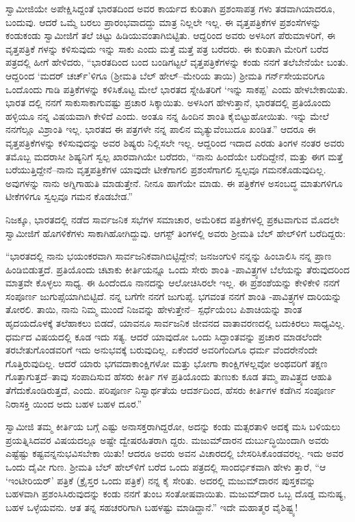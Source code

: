 ಸ್ವಾಮೀಜಿಯೇ ಅಪೇಕ್ಷಿಸಿದ್ದಂತೆ ಭಾರತದಿಂದ ಅವರ ಕಾರ್ಯದ ಕುರಿತಾಗಿ ಪ್ರಶಂಸಾಪತ್ರ ಗಳು ತಡವಾಗಿಯಾದರೂ, ಬಂದುವು. ಆದರೆ ಒಮ್ಮೆ ಬರಲು ಪ್ರಾರಂಭವಾದದ್ದು ಮಾತ್ರ ನಿಲ್ಲಲೇ ಇಲ್ಲ. ಈ ವೃತ್ತಪತ್ರಿಕೆಗಳ ಪ್ರಶಂಸೆಗಳನ್ನು ಕಂಡುಕಂಡು ಸ್ವಾಮೀಜಿಗೆ ತಲೆ ಚಿಟ್ಟು ಹಿಡಿಯುವಂತಾಗಿಬಿಟ್ಟಿತು. ಆದ್ದರಿಂದ ಅವರು ಅಳಸಿಂಗ ಪೆರುಮಾಳರಿಗೆ, ಈ ವೃತ್ತಪತ್ರಿಕೆ ಗಳನ್ನು ಕಳಿಸುವುದು ಇನ್ನು ಸಾಕು ಎಂದು ಮತ್ತೆ ಮತ್ತೆ ಪತ್ರ ಬರೆದರು. ಈ ಕುರಿತಾಗಿ ಮೇರಿಗೆ ಬರೆದ ಪತ್ರದಲ್ಲಿ ಹೀಗೆ ಹೇಳಿದರು, “ಭಾರತದಿಂದ ಬಂದ ಬಂಡಿಗಟ್ಟಲೆ ವೃತ್ತಪತ್ರಿಕೆಗಳನ್ನು ಕಂಡು ನನಗೆ ತಲೆಬೇನೆಯೇ ಬಂತು. ಆದ್ದರಿಂದ ‘ಮದರ್ ಚರ್ಚ್​’ಳಿಗೂ (ಶ್ರೀಮತಿ ಬೆಲ್ ಹೇಲ್​–ಮೇರಿಯ ತಾಯಿ) ಶ್ರೀಮತಿ ಗರ್ನ್​ಸೇಯವರಿಗೂ ಒಂದೊಂದು ಗಾಡಿ ಪತ್ರಿಕೆಗಳನ್ನು ಕಳಿಸಿಕೊಟ್ಟ ಮೇಲೆ ಭಾರತದ ಸ್ನೇಹಿತರಿಗೆ ‘ಇನ್ನು ಸಾಕಪ್ಪ’ ಎಂದು ಹೇಳಬೇಕಾಯಿತು. ಭಾರತ ದಲ್ಲಿ ನನಗೆ ಸಾಕುಸಾಕಾಗುವಷ್ಟು ಪ್ರಚಾರ ಸಿಕ್ಕಾಯಿತು. ಅಳಸಿಂಗ ಹೇಳುತ್ತಾನೆ, ಭಾರತದಲ್ಲಿ ಪ್ರತಿಯೊಂದು ಹಳ್ಳಿಯೂ ನನ್ನ ವಿಷಯವಾಗಿ ಕೇಳಿದೆ ಎಂದು. ಅಂತೂ ನನ್ನ ಹಿಂದಿನ ಶಾಂತಿ ಕೈಬಿಟ್ಟುಹೋಯಿತು. ಇನ್ನು ಮೇಲೆ ನನಗೆಲ್ಲೂ ವಿಶ್ರಾಂತಿ ಇಲ್ಲ. ಭಾರತದ ಈ ಪತ್ರಗಳೇ ನನ್ನ ಪಾಲಿನ ಮೃತ್ಯುವೆಂಬುದೂ ಖಂಡಿತ.” ಆದರೂ ಈ ವೃತ್ತಪತ್ರಿಕೆಗಳನ್ನು ಕಳಿಸುವುದನ್ನು ಅವರ ಶಿಷ್ಯರು ನಿಲ್ಲಿಸಲೇ ಇಲ್ಲ. ಆದ್ದರಿಂದ ಇದಾದ ಎರಡು ತಿಂಗಳ ನಂತರ ಅವರು ತಮೊಬ್ಬ ಮದರಾಸೀ ಶಿಷ್ಯನಿಗೆ ಸ್ವಲ್ಪ ಖಾರವಾಗಿಯೇ ಬರೆದರು, “ನಾನು ಹಿಂದೆಯೇ ಬರೆದಿದ್ದೇನೆ, ಮತ್ತು ಈಗ ಮತ್ತೆ ಬರೆಯುತ್ತಿದ್ದೇನೆ–ನಾನು ವೃತ್ತಪತ್ರಿಕೆಗಳ ಯಾವುದೇ ಟೀಕೆಗಾಗಲಿ ಪ್ರಶಂಸೆಗಾಗಲಿ ಸ್ವಲ್ಪವೂ ಗಮನಕೊಡುವುದಿಲ್ಲ. ಅವುಗಳನ್ನು ನಾನು ಅಗ್ನಿಗಾಹುತಿ ಮಾಡುತ್ತೇನೆ. ನೀನೂ ಹಾಗೆಯೇ ಮಾಡು. ಈ ಪತ್ರಿಕೆಗಳ ಅಸಂಬದ್ಧ ಮಾತುಗಳಿಗೂ ಟೀಕೆಗಳಿಗೂ ಸ್ವಲ್ಪವೂ ಗಮನ ಕೊಡಬೇಡ.”

ನಿಜಕ್ಕೂ, ಭಾರತದಲ್ಲಿ ನಡೆದ ಸಾರ್ವಜನಿಕ ಸಭೆಗಳ ಸಮಾಚಾರ, ಅಮೆರಿಕದ ಪತ್ರಿಕೆಗಳಲ್ಲಿ ಪ್ರಕಟವಾಗುವ ಮೊದಲೇ ಸ್ವಾಮೀಜಿಗೆ ಹೊಗಳಿಕೆಗಳು ಸಾಕಾಗಿಹೋಗಿದ್ದುವು. ಆಗಸ್ಟ್ ತಿಂಗಳಲ್ಲಿ ಅವರು ಶ್ರೀಮತಿ ಬೆಲ್ ಹೇಲ್​ಳಿಗೆ ಬರೆದಿದ್ದರು:

“ಭಾರತದಲ್ಲಿ ನಾನು ಭಯಂಕರವಾಗಿ ಸಾರ್ವಜನಿಕವಾಗಿಬಿಟ್ಟಿದ್ದೇನೆ; ಜನಜಂಗುಳಿ ನನ್ನನ್ನು ಹಿಂಬಾಲಿಸಿ ನನ್ನ ಪ್ರಾಣ ಹಿಂಡಿಬಿಡುತ್ತದೆ. ಪ್ರತಿಯೊಂದು ಚಟಾಕು ಕೀರ್ತಿಯನ್ನೂ ಒಂದು ಸೇರು ಶಾಂತಿ -ಪಾವಿತ್ರ್ಯಗಳ ಬೆಲೆಯನ್ನು ತೆರುವುದರಿಂದ ಮಾತ್ರವೇ ಕೊಳ್ಳಲು ಸಾಧ್ಯ. ಈ ಹಿಂದೆಂದೂ ನಾನದನ್ನು ಆಲೋಚಿಸಿರಲೇ ಇಲ್ಲ. ಈ ಪ್ರಶಂಶೆಯನ್ನು ಕೇಳಿಕೇಳಿ ನನಗೆ ಸಂಪೂರ್ಣ ಜುಗುಪ್ಸೆಯಾಗಿಬಿಟ್ಟಿದೆ. ನನ್ನ ಬಗೆಗೇ ನನಗೆ ಜುಗುಪ್ಸೆ. ಭಗವಂತ ನನಗೆ ಶಾಂತಿ -ಪಾವಿತ್ರ್ಯಗಳ ದಾರಿಯನ್ನು ತೋರಲಿ. ತಾಯಿ, ನಾನು ನಿಮ್ಮ ಮುಂದೆ ನಿಜವನ್ನು ಹೇಳುತ್ತೇನೆ– ಸ್ಪರ್ಧೆಯೆಂಬ ಪಿಶಾಚಿಯನ್ನು ಶಾಂತ ಹೃದಯದೊಳಕ್ಕೆ ತಲೆಹಾಕಲು ಬಿಡದೆ, ಯಾವನೂ ಸಾರ್ವಜನಿಕ ಜೀವನದ ವಾತಾವರಣದಲ್ಲಿ ಬದುಕಿರಲು ಸಾಧ್ಯವಿಲ್ಲ. ಧರ್ಮದ ವಿಷಯದಲ್ಲಿ ಕೂಡ ಇದು ಸತ್ಯ. ಆದರೆ ಯಾವುದೋ ಒಂದು ಸಿದ್ಧಾಂತವನ್ನು ಪ್ರಚಾರ ಮಾಡಲೆಂದೇ ತರಬೇತುಗೊಂಡವರಿಗೆ ಇದು ಅನುಭವಕ್ಕೆ ಬರುವುದಿಲ್ಲ. ಏಕೆಂದರೆ ಅವರಿಗೆಂದಿಗೂ ಧರ್ಮ ವೆಂದರೇನೆಂದೇ ಗೊತ್ತಿರುವುದಿಲ್ಲ. ಆದರೆ ಯಾರು ಭಗವದಾಕಾಂಕ್ಷಿಗಳೋ ಮತ್ತು ಭೋಗಾ ಕಾಂಕ್ಷಿಗಳಲ್ಲವೋ ಅಂಥವರಿಗೆ ತಕ್ಷಣ ಗೊತ್ತಾಗುತ್ತದೆ–ತಾವು ಸಂಪಾದಿಸುವ ಹೆಸರು ಕೀರ್ತಿ ಗಳ ಪ್ರತಿಯೊಂದು ತುಣುಕು ಕೂಡ ತಮ್ಮ ಪಾವಿತ್ರ್ಯದ ಆಹುತಿ ತೆಗೆದುಕೊಂಡಿರುತ್ತದೆ, ಎಂದು. ಪರಿಪೂರ್ಣ ನಿಸ್ವಾರ್ಥತೆಯ ಆದರ್ಶದಿಂದ, ಹೆಸರು ಕೀರ್ತಿಗಳ ಕಡೆಗಿನ ಸಂಪೂರ್ಣ ನಿರಾಸಕ್ತಿ ಯಿಂದ ಅದು ಬಹಳ ಬಹಳ ದೂರ.”

ಸ್ವಾಮೀಜಿ ತಮ್ಮ ಕೀರ್ತಿಯ ಬಗ್ಗೆ ಎಷ್ಟು ಅನಾಸಕ್ತರಾಗಿದ್ದರೋ, ಅದನ್ನು ಕಂಡು ಮತ್ಸರತಾಳಿ ಅದಕ್ಕೆ ಮಸಿ ಬಳಿಯಲು ಪ್ರಯತ್ನಿಸಿದವರ ವಿಷಯದಲ್ಲೂ ಅಷ್ಟೇ ದ್ವೇಷರಹಿತರಾಗಿ ದ್ದರು. ಮಜುಮ್​ದಾರನ ದುರ್ಬುದ್ಧಿಯಿಂದಾಗಿ ಅವರು ಎಷ್ಟೆಷ್ಟು ಕಷ್ಟವನ್ನನುಭವಿಸಬೇಕಾ ಯಿತು! ಆದರೂ ಅವರು ಅವನ ವಿಚಾರದಲ್ಲಿ ಬೇಸರಿಸಿಕೊಂಡವರಲ್ಲ. ಇದು ಅವರ ಒಂದು ದೈವೀ ಗುಣ. ಶ್ರೀಮತಿ ಬೆಲ್ ಹೇಲ್​ಳಿಗೆ ಬರೆದ ಒಂದು ಪತ್ರದಲ್ಲಿ ಸಾಂದರ್ಭಿಕವಾಗಿ ಹೇಳು ತ್ತಾರೆ, “ಆ ‘ಇಂಟೀರಿಯರ್​’ ಪತ್ರಿಕೆ (ಕ್ರೈಸ್ತರ ಒಂದು ಪತ್ರಿಕೆ) ನನ್ನ ಕೈ ಸೇರಿತು. ಅದರಲ್ಲಿ ಮಜುಮ್​ದಾರನ ಪುಸ್ತಕವನ್ನು ಬಹಳವಾಗಿ ಪ್ರಶಂಸಿಸಿರುವುದನ್ನು ಕಂಡು ನನಗೆ ತುಂಬ ಸಂತೋಷವಾಯಿತು. ಮಜುಮ್​ದಾರ ಒಬ್ಬ ದೊಡ್ಡ ಮನುಷ್ಯ, ಬಹಳ ಒಳ್ಳೆಯವನು. ಆತ ತನ್ನ ಸಹಚರರಿಗಾಗಿ ಬಹಳಷ್ಟು ಮಾಡಿದ್ದಾನೆ.” ಇದೇ ಮಹಾತ್ಮರ ವೈಶಿಷ್ಟ್ಯ!


